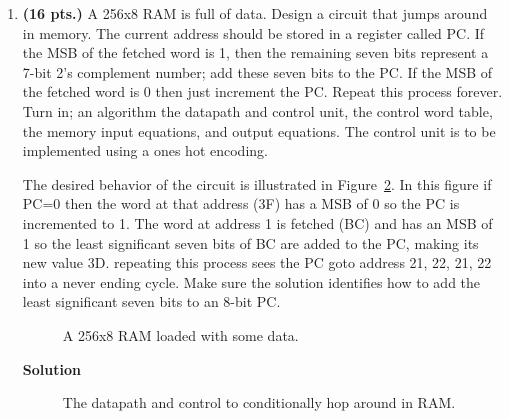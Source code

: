 \begin{enumerate}
        To desired behavior of the circuit is illustrates in
        Figure~\ref{fig:RAMhopper}.  If the address=0 then the circuit will
        jump to address 3F then 28, 53, 3F and continue cycling
        for ever amount these three addresses.

        \begin{figure}[ht]
            \caption{A 256x8 RAM loaded with some data.}
            \label{fig:RAMhopper}
        \end{figure}

    \item \textbf{ (16 pts.)}
        A 256x8 RAM is full of data.  Design a circuit that jumps
        around in memory.   The current address should be stored in a
        register called PC.  If the MSB of the fetched word is 1, then the
        remaining seven bits represent a 7-bit 2's complement number;  add these
        seven bits to the PC.  If the MSB of the fetched word is 0 then just
        increment the PC.  Repeat this process forever.
        Turn in; an algorithm the datapath and control unit, the control word
        table, the memory input equations, and output equations.
        The control unit is to be implemented using a ones hot encoding.

        The desired behavior of the circuit is illustrated in
        Figure~\ref{fig:RAMhopper2}.  In this figure if PC=0 then the word at
        that address (3F) has a MSB of 0 so the PC is incremented to 1. The
        word at address 1 is fetched (BC) and has an MSB of 1 so the least
        significant seven bits of BC are added to the PC, making its new value
        3D.  repeating this process sees the PC goto address 21, 22, 21, 22
        into a never ending cycle.   Make sure the solution identifies how
        to add the least significant seven bits to an 8-bit PC.

        \begin{figure}[ht]
            \caption{A 256x8 RAM loaded with some data.}
            \label{fig:RAMhopper2}
        \end{figure}

        \begin{onlysolution}  \textbf{Solution} \itshape{

                \begin{figure}[ht]
                    \caption{The datapath and control to conditionally hop around
                    in RAM.}
                \end{figure}

}
\end{onlysolution}
\end{enumerate}
